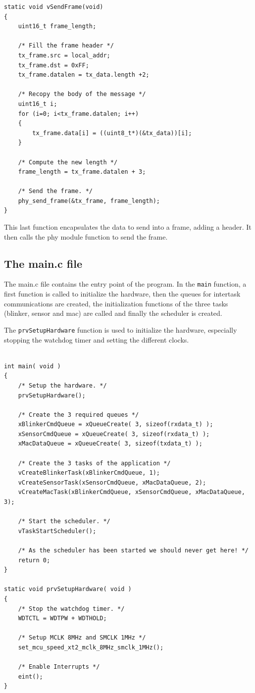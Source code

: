 \documentclass[11pt]{report}
\begin{document}
\begin{verbatim}
static void vSendFrame(void)
{
    uint16_t frame_length;
    
    /* Fill the frame header */
    tx_frame.src = local_addr;
    tx_frame.dst = 0xFF;
    tx_frame.datalen = tx_data.length +2;
    
    /* Recopy the body of the message */
    uint16_t i;
    for (i=0; i<tx_frame.datalen; i++)
    {
        tx_frame.data[i] = ((uint8_t*)(&tx_data))[i];
    }
    
    /* Compute the new length */
    frame_length = tx_frame.datalen + 3;
    
    /* Send the frame. */
    phy_send_frame(&tx_frame, frame_length);
}
\end{verbatim}
This last function encapsulates the data to send into a frame, adding a header. It then calls the phy module function to send the frame.


\subsection{The main.c file}
The main.c file contains the entry point of the program. In the \verb$main$ function, a first function is called to initialize the hardware, then the queues for intertask communications are created, the initialization functions of the three tasks (blinker, sensor and mac) are called and finally the scheduler is created.

The \verb$prvSetupHardware$ function is used to initialize the hardware, especially stopping the watchdog timer and setting the different clocks.

\begin{verbatim}

int main( void )
{
    /* Setup the hardware. */
    prvSetupHardware();
    
    /* Create the 3 required queues */
    xBlinkerCmdQueue = xQueueCreate( 3, sizeof(rxdata_t) );
    xSensorCmdQueue = xQueueCreate( 3, sizeof(rxdata_t) );
    xMacDataQueue = xQueueCreate( 3, sizeof(txdata_t) );
    
    /* Create the 3 tasks of the application */
    vCreateBlinkerTask(xBlinkerCmdQueue, 1);
    vCreateSensorTask(xSensorCmdQueue, xMacDataQueue, 2);
    vCreateMacTask(xBlinkerCmdQueue, xSensorCmdQueue, xMacDataQueue, 3);
    
    /* Start the scheduler. */
    vTaskStartScheduler();
    
    /* As the scheduler has been started we should never get here! */
    return 0;
}

static void prvSetupHardware( void )
{
    /* Stop the watchdog timer. */
    WDTCTL = WDTPW + WDTHOLD;
    
    /* Setup MCLK 8MHz and SMCLK 1MHz */
    set_mcu_speed_xt2_mclk_8MHz_smclk_1MHz();
    
    /* Enable Interrupts */
    eint();
}

\end{verbatim}
\end{document}
